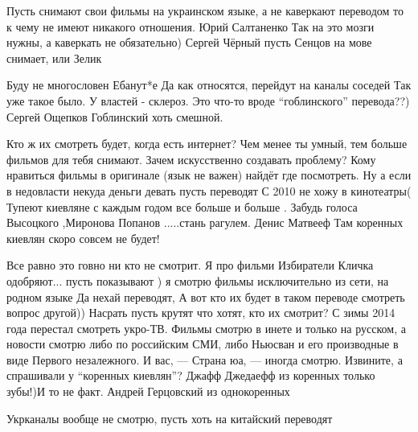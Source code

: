 \begin{itemize}
Пусть снимают свои фильмы на украинском языке, а не каверкают переводом то к чему не имеют никакого отношения.
Юрий Салтаненко Так на это мозги нужны, а каверкать не обязательно)
Сергей Чёрный пусть Сенцов на мове снимает, или Зелик

Буду не многословен Ебанут*е
Да как относятся, перейдут на каналы соседей
Так уже такое было. У властей - склероз.
Это что-то вроде \enquote{гоблинского} перевода??)
Сергей Ощепков Гоблинский хоть смешной.

Кто ж их смотреть будет, когда есть интернет?
Чем менее ты умный, тем больше фильмов для тебя снимают.
Зачем искусственно создавать проблему? Кому нравиться фильмы в оригинале (язык
не важен) найдёт где посмотреть. Ну а если в недовласти некуда деньги девать
пусть переводят
С 2010 не хожу в кинотеатры(
Тупеют киевляне с каждым годом все больше и больше . Забудь голоса Высоцкого ,Миронова Попанов .....стань рагулем.
Денис Матвееф Там коренных киевлян скоро совсем не будет!

Все равно это говно ни кто не смотрит. Я про фильми
Избиратели Кличка одобряют...
пусть показывают ) я смотрю фильмы исключительно из сети, на родном языке
Да нехай переводят, А вот кто их будет в таком переводе смотреть вопрос другой))
Насрать пусть крутят что хотят, кто их смотрит?
С зимы 2014 года перестал смотреть укро-ТВ. Фильмы смотрю в инете и только на
русском, а новости смотрю либо по российским СМИ, либо Ньюсван и его
производные в виде Первого незалежного. И вас, — Страна юа, — иногда смотрю.
Извините, а спрашивали у \enquote{коренных киевлян}?
Джафф Джедаефф из коренных только зубы!)И то не факт.
Андрей Герцовский из однокоренных

Укрканалы вообще не смотрю, пусть хоть на китайский переводят

\end{itemize}
